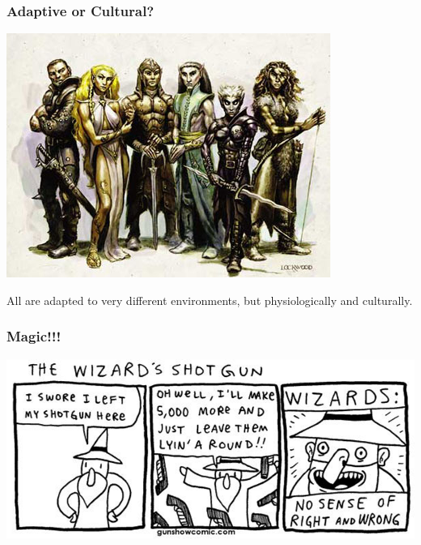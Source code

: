 \documentclass{beamer}\usepackage{graphicx, color}
\begin{document}
\begin{frame}
  \frametitle{Adaptive or Cultural?}
  \begin{center}
    \includegraphics[height = 0.5\textheight, keepaspectratio = true]{elf_2}
  \end{center}

  All are adapted to very different environments, but physiologically and culturally.

\end{frame}

\begin{frame}
  \frametitle{Magic!!!}
  \includegraphics[width = \textwidth, keepaspectratio = true]{wizard_comic}

\end{frame}
\end{document}
